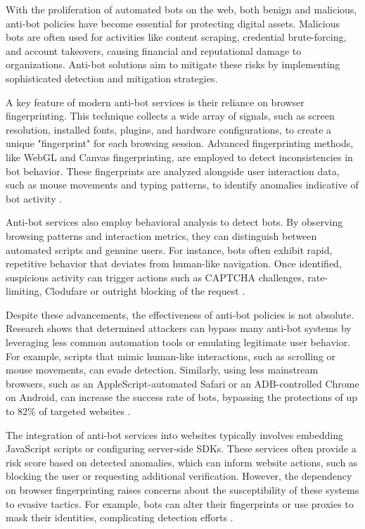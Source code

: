 With the proliferation of automated bots on the web, both benign and malicious, anti-bot policies have become essential for protecting digital assets. Malicious bots are often used for activities like content scraping, credential brute-forcing, and account takeovers, causing financial and reputational damage to organizations. Anti-bot solutions aim to mitigate these risks by implementing sophisticated detection and mitigation strategies.

A key feature of modern anti-bot services is their reliance on browser fingerprinting. This technique collects a wide array of signals, such as screen resolution, installed fonts, plugins, and hardware configurations, to create a unique "fingerprint" for each browsing session. Advanced fingerprinting methods, like WebGL and Canvas fingerprinting, are employed to detect inconsistencies in bot behavior. These fingerprints are analyzed alongside user interaction data, such as mouse movements and typing patterns, to identify anomalies indicative of bot activity \cite{4}.

Anti-bot services also employ behavioral analysis to detect bots. By observing browsing patterns and interaction metrics, they can distinguish between automated scripts and genuine users. For instance, bots often exhibit rapid, repetitive behavior that deviates from human-like navigation. Once identified, suspicious activity can trigger actions such as CAPTCHA challenges, rate-limiting, Clodufare or outright blocking of the request \cite{4}.

Despite these advancements, the effectiveness of anti-bot policies is not absolute. Research shows that determined attackers can bypass many anti-bot systems by leveraging less common automation tools or emulating legitimate user behavior. For example, scripts that mimic human-like interactions, such as scrolling or mouse movements, can evade detection. Similarly, using less mainstream browsers, such as an AppleScript-automated Safari or an ADB-controlled Chrome on Android, can increase the success rate of bots, bypassing the protections of up to 82\% of targeted websites \cite{4}.

The integration of anti-bot services into websites typically involves embedding JavaScript scripts or configuring server-side SDKs. These services often provide a risk score based on detected anomalies, which can inform website actions, such as blocking the user or requesting additional verification. However, the dependency on browser fingerprinting raises concerns about the susceptibility of these systems to evasive tactics. For example, bots can alter their fingerprints or use proxies to mask their identities, complicating detection efforts \cite{4}.


